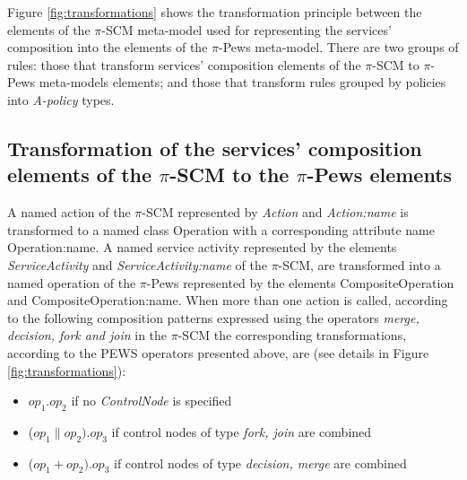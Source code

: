 
Figure \ref{fig:transformations} shows the transformation principle between the elements of the $\pi$-SCM meta-model used for representing the services' composition into the elements of the $\pi$-{\sc Pews} meta-model. There are two groups of rules: those that transform services' composition elements of the $\pi$-SCM to $\pi$-{\sc Pews} meta-models elements; and those that transform rules grouped by policies into {\em A-policy} types.


\subsection{Transformation of the services' composition elements of the $\pi$-SCM to the $\pi$-{\sc Pews} elements}
A named action of the $\pi$-SCM represented by  {\sc\em Action} and {\sc\em Action:name} is transformed to a  named class {\sc Operation} with a corresponding attribute name {\sc Operation:name}. A  named service activity represented by the elements {\sc\em ServiceActivity}  and  {\sc\em ServiceActivity:name} of the $\pi$-SCM, are  transformed into a named operation of the $\pi$-{\sc Pews} represented by the elements  {\sc CompositeOperation} and {\sc CompositeOperation:name}. When more than one action is called, according to the following  composition patterns expressed using the operators {\sc\em merge, decision, fork and join} in the $\pi$-SCM the corresponding transformations, according to the PEWS operators presented above, are (see details in Figure \ref{fig:transformations}):
\begin{itemize}
\item   $op_1 . op_2$ if no {\sc\em ControlNode} is specified
\item ($op_1 \parallel op_2) . op_3$ if control nodes of type {\sc\em fork, join} are combined
 \item ($op_1 + op_2) . op_3$ if control nodes of type {\sc\em decision, merge} are combined
\end{itemize}

